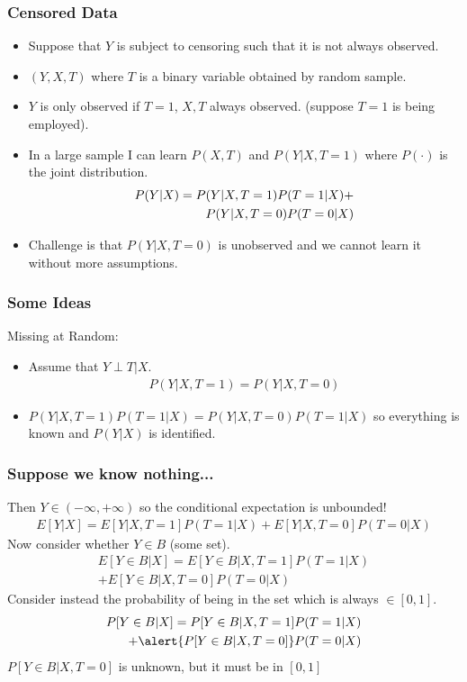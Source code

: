 \documentclass[xcolor=pdftex,dvipsnames,table,mathserif]{beamer}
\begin{document}
\begin{frame}
\frametitle{Censored Data}
\begin{itemize}
\item Suppose that $Y$ is subject to censoring such that it is not always observed.
\item $(Y,X,T)$ where $T$ is a binary variable obtained by random sample.
\item $Y$ is only observed if $T=1$, $X,T$ always observed. (suppose $T=1$ is being employed).
\item In a large sample I can learn $P(X,T)$ and $P(Y | X,T=1)$ where $P(\cdot)$ is the joint distribution.
\begin{eqnarray*}
\small
P(Y| X)  = P(Y|X,T=1) P(T=1 | X) +\\
 P(Y | X,T=0) P(T=0| X)
\end{eqnarray*}
\item Challenge is that $P(Y|X,T=0)$ is unobserved and we cannot learn it without more assumptions.
\end{itemize}
\end{frame}


\begin{frame}
\frametitle{Some Ideas}
 \alert{Missing at Random}:
\begin{itemize}
\item Assume that  $Y \perp T | X$.
\begin{eqnarray*}
P(Y | X,T=1) = P(Y | X,T=0)
\end{eqnarray*}
\item $ P(Y | X,T=1) P(T=1| X) =  P(Y | X,T=0) P(T=1 | X)$ so everything is known and $P(Y|X)$ is identified.
\end{itemize}
\end{frame}


\begin{frame}
\frametitle{Suppose we know nothing...}
Then $Y \in (-\infty,+\infty)$ so the conditional expectation is unbounded!
\begin{eqnarray*}
E[Y | X] = E[Y | X, T=1] P(T=1 | X) + E[Y | X,T =0] P(T=0 | X)
\end{eqnarray*}
Now consider whether $Y \in B$ (some set). 
\begin{eqnarray*}
E[Y \in B  | X] = E[Y \in B | X, T=1] P(T=1 | X) \\
+ E[Y \in B | X,T =0] P(T=0 | X)
\end{eqnarray*}
Consider instead the probability of being in the set which is always $\in [0,1]$.
\begin{eqnarray*}
P[Y \in B  | X] = P[Y \in B | X, T=1] P(T=1 | X) \\
+ \alert{P[Y \in B | X,T =0]} P(T=0 | X)
\end{eqnarray*}
\alert{$P[Y \in B | X,T =0] $} is unknown, but it must be in $[0,1]$
\end{frame}
\end{document}
